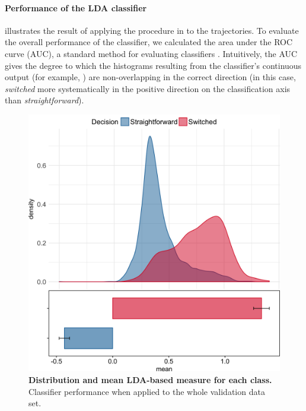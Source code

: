 \documentclass{article}
\begin{document}
\paragraph{Performance of the LDA classifier}
 illustrates the result of applying the procedure in  to the trajectories. 
To evaluate the overall performance of the classifier, we calculated the area under the ROC curve (AUC), a standard method for evaluating classifiers \citep{Hastie}. Intuitively, the AUC gives the degree to which the histograms resulting from the classifier's continuous output (for example, ) are non-overlapping in the correct direction (in this case, \textit{switched} more systematically in the positive direction on the classification axis than \textit{straightforward}). 


\begin{figure}
\centering
\includegraphics[width=.8\textwidth]{lda_distribution_calibration.png}
\caption{\textbf{Distribution and mean LDA-based measure for each class.} Classifier performance when applied to the whole validation data set.} \label{DIST:LDA}
\end{figure}
\end{document}

